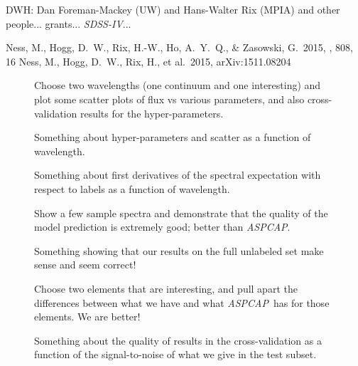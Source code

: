 \documentclass[12pt,preprint]{aastex}
\newcommand{\project}[1]{\textsl{#1}}
\newcommand{\acronym}[1]{{\small{#1}}}
\newcommand{\sdss}{\project{\acronym{SDSS-IV}}}
\newcommand{\aspcap}{\project{\acronym{ASPCAP}}}
\begin{document}
\acknowledgements
DWH: Dan Foreman-Mackey (UW) and Hans-Walter Rix (MPIA) and other people...
grants...
\sdss...

\begin{thebibliography}{dummy}\raggedright
{} Ness, M., Hogg, D.~W., 
Rix, H.-W., Ho, A.~Y.~Q., \& Zasowski, G.\ 2015, \apj, 808, 16
 Ness, M., Hogg, D.~W., 
Rix, H., et al.\ 2015, arXiv:1511.08204 
\end{thebibliography}

\clearpage

\begin{figure}[p]
\caption{Choose two wavelengths (one continuum and one interesting)
  and plot some scatter plots of flux vs various parameters, and also
  cross-validation results for the
  hyper-parameters.\label{fig:onewavelength}}
\end{figure}

\begin{figure}[p]
\caption{Something about hyper-parameters and scatter as a function of
  wavelength.\label{fig:hyperpars}}
\end{figure}

\begin{figure}[p]
\caption{Something about first derivatives of the spectral expectation
  with respect to labels as a function of
  wavelength.\label{fig:derivatives}}
\end{figure}

\begin{figure}[p]
\caption{Show a few sample spectra and demonstrate that the quality of
  the model prediction is extremely good; better than
  \aspcap.\label{fig:correctness}}
\end{figure}

\begin{figure}[p]
\caption{Something showing that our results on the full unlabeled set
  make sense and seem correct!\label{fig:fulltest}}
\end{figure}

\begin{figure}[p]
\caption{Choose two elements that are interesting, and pull apart the
  differences between what we have and what \aspcap\ has for those
  elements.  We are better!\label{fig:elements}}
\end{figure}

\begin{figure}[p]
\caption{Something about the quality of results in the
  cross-validation as a function of the signal-to-noise of what we
  give in the test subset.\label{fig:snr}}
\end{figure}
\end{document}
